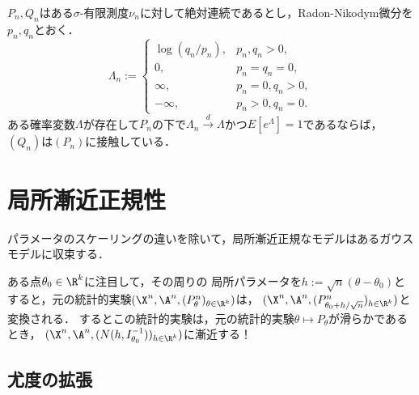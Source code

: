\documentclass[uplatex,dvipdfmx]{jsreport}
\begin{document}
\begin{lemma}[接触性の十分条件]
    $P_n,Q_n$はある$\sigma$-有限測度$\nu_n$に対して絶対連続であるとし，Radon-Nikodym微分を$p_n,q_n$とおく．
    \[\Lambda_n:=\begin{cases}
        \log(q_n/p_n),&p_n,q_n>0,\\
        0,&p_n=q_n=0,\\
        \infty,&p_n=0,q_n>0,\\
        -\infty,&p_n>0,q_n=0.
    \end{cases}\]
    ある確率変数$\Lambda$が存在して$P_n$の下で$\Lambda_n\xrightarrow{d}\Lambda$かつ$E[e^\Lambda]=1$であるならば，$(Q_n)$は$(P_n)$に接触している．
\end{lemma}

\section{局所漸近正規性}

\begin{tcolorbox}[colframe=ForestGreen, colback=ForestGreen!10!white,breakable,colbacktitle=ForestGreen!40!white,coltitle=black,fonttitle=\bfseries\sffamily,
title=]
パラメータのスケーリングの違いを除いて，局所漸近正規なモデルはあるガウスモデルに収束する．
\end{tcolorbox}

\begin{discussion}
    ある点$\theta_0\in\R^k$に注目して，その周りの
    局所パラメータを$h:=\sqrt{n}(\theta-\theta_0)$とすると，元の統計的実験$(\X^n,\A^n,(P_\theta^n)_{\theta\in\R^k})$は，
    $(\X^n,\A^n,(P^n_{\theta_0+h/\sqrt{n}})_{h\in\R^k})$と変換される．
    するとこの統計的実験は，元の統計的実験$\theta\mapsto P_\theta$が滑らかであるとき，
    $(\X^n,\A^n,(N(h,I_{\theta_0}^{-1}))_{h\in\R^k})$に漸近する！
\end{discussion}

\subsection{尤度の拡張}
\end{document}
